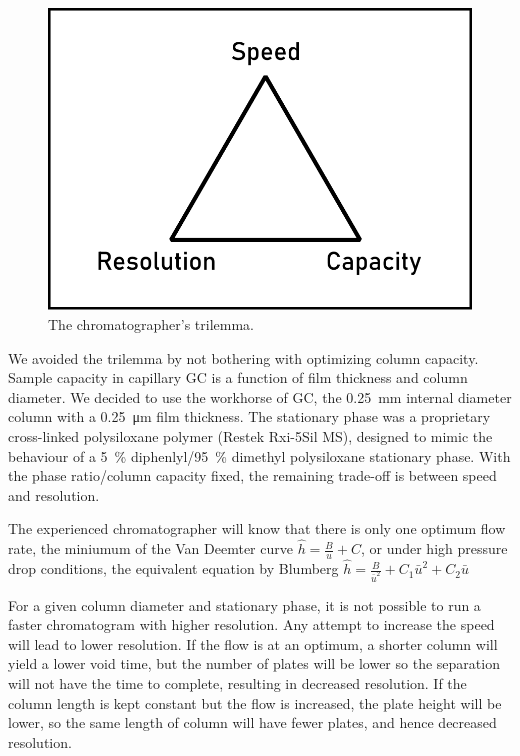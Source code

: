 \begin{figure}
\centering
\includegraphics[width=\textwidth]{Figures/Triangle.pdf}
\decoRule

\caption[Schematic diagram of a the chromatograher's trilemma.]{The chromatographer's trilemma.}

\label{fig:trilemma}
\end{figure}

We avoided the trilemma by not bothering with optimizing column capacity. Sample
capacity in capillary GC is a function of film thickness and column diameter. We
decided to use the workhorse of GC, the \SI{0.25}{\milli\metre} internal
diameter column with a \SI{0.25}{\micro\metre} film thickness. The stationary
phase was a proprietary cross-linked polysiloxane polymer (Restek
Rxi\textregistered{}-5Sil MS), designed to mimic the behaviour of a
\SI{5}{\percent} diphenlyl/\SI{95}{\percent} dimethyl polysiloxane stationary
phase. With the phase ratio/column capacity fixed, the remaining trade-off is
between speed and resolution.

The experienced chromatographer will know that there is only one optimum flow
rate, the miniumum of the Van Deemter curve \(\hat{h}=\frac{B}{u}+C\), or under
high pressure drop conditions, the equivalent equation by Blumberg
 \(\hat{h}=\frac{B}{\bar{u}^2} + C_1\bar{u}^2 +
C_2\bar{u}\)

For a given column diameter and stationary phase, it is not possible to run a
faster chromatogram with higher resolution. Any attempt to increase the speed
will lead to lower resolution. If the flow is at an optimum, a shorter column
will yield a lower void time, but the number of plates will be lower so the
separation will not have the time to complete, resulting in decreased
resolution. If the column length is kept constant but the flow is increased, the
plate height will be lower, so the same length of column will have fewer plates, and hence
decreased resolution. 

